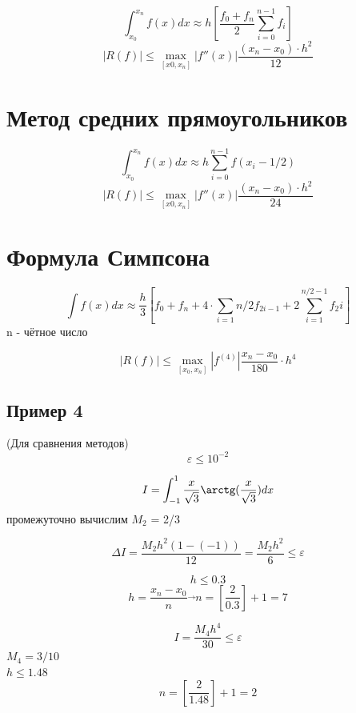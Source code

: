 \documentclass[a4paper,12pt]{article}
\begin{document}
$$\int_{x_0}^{x_n} f(x) dx \approx h [\frac{f_0 + f_n}{2} \sum_{i = 0}^{n-1}f_i]$$
$$|R(f)| \leq \max_{[x0, x_n]} |f''(x)| \frac{(x_n - x_0) \cdot h^2}{12}$$

\section* {Метод средних прямоугольников}
$$\int_{x_0}^{x_n} f(x) dx \approx h \sum_{i = 0}^{n-1}f(x_i - 1/2)$$
$$|R(f)| \leq \max_{[x0, x_n]} |f''(x)| \frac{(x_n - x_0) \cdot h^2}{24}$$

\section* {Формула Симпсона}

$$\int f(x) dx \approx \frac{h}{3} [f_0 + f_n + 4\cdot \sum_{i=1}{n/2} f_{2i-1} + 2 \sum_{i=1}^{n/2 - 1} f_2i]$$
n - чётное число

$$|R(f)| \leq \max_{[x_0, x_n]} |f^{(4)}| \frac{x_n - x_0}{180} \cdot h^4$$

\subsection*{Пример 4}
    (Для сравнения методов)\\
    $$\varepsilon \leq 10^{-2}$$
    
    \[I = \int_{-1}^1 \frac{x}{\sqrt{3}} \arctg (\frac{x}{\sqrt{3}}) dx\]
    промежуточно вычислим $M_2$ = 2/3

    \[\Delta I = \frac{M_2 h^2 (1 -(-1))}{12} = \frac{M_2 h^2 }{6} \leq \varepsilon\]

    \[h \leq 0.3\]
    \[h = \frac{x_n - x_0}{n} \overrightarrow{} n = [\frac{2}{0.3}] + 1 = 7\]
    
    \[I = \frac{M_4 h^4}{30} \leq \varepsilon\]
    $M_4 = 3/10$\\
    $h \leq 1.48$
    \[n = [\frac{2}{1.48}] + 1 = 2\]
\end{document}
